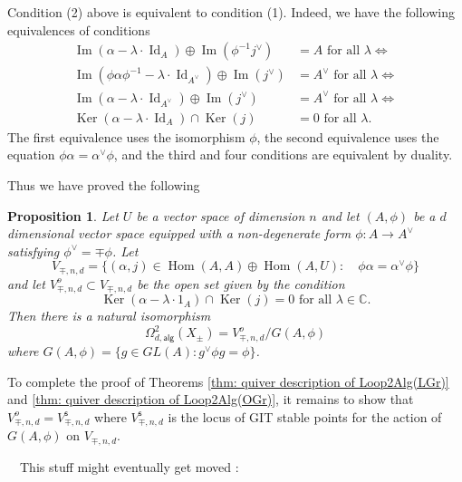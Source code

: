 \documentclass{amsart}
\newtheorem{proposition}[theorem]{Proposition}
\theoremstyle{definition}
\newcommand{\CC} {{\mathbb C}}          %
\newcommand{\Hom}{\operatorname{Hom}}
\newcommand{\Ker}{\operatorname{Ker}}
\newcommand{\im}{\operatorname{Im}}
\newcommand{\alg}{\mathsf{alg}}
\newcommand{\stable}{\mathsf{s}}
\newcommand{\LoopTwo}{\Omega^{2}_{d,\alg}}
\newcommand{\Id}{\operatorname{Id}}
\newcommand{\Xpm}{X_{\pm}}
\begin{document}
\bigskip

Condition (2) above is equivalent to condition (1). Indeed, we have
the following equivalences of conditions
\begin{align*}
\im (\alpha -\lambda \cdot \Id_{A})\oplus  \im (\phi^{-1}j^{\vee} )&=A
\text{ for all } \lambda \iff \\
\im (\phi \alpha\phi^{-1} -\lambda \cdot \Id_{A^{\vee }})\oplus  \im
(j^{\vee} )&=A^{\vee }
\text{ for all } \lambda \iff \\
\im (\alpha -\lambda \cdot \Id_{A^{\vee }})\oplus  \im
(j^{\vee} )&=A^{\vee }
\text{ for all } \lambda \iff \\
\Ker (\alpha -\lambda \cdot \Id_{A})\cap \Ker (j) &= 0 \text{ for all } \lambda .
\end{align*}
The first equivalence uses the isomorphism $\phi$, the second
equivalence uses the equation $\phi \alpha  = \alpha^{\vee}\phi$, and
the third and four conditions are equivalent by duality.

Thus we have proved the following
\begin{proposition}\label{prop: quiver description of Loop2Alg(Xpm)
with explicit open condition}
Let $U$ be a vector space of dimension $n$ and let $(A,\phi )$ be a
$d$ dimensional vector space equipped with a non-degenerate form $\phi
:A\to A^{\vee}$ satisfying $\phi^{\vee}=\mp \phi$. Let
\[
V_{\mp ,n,d} = \{(\alpha ,j)\in \Hom (A,A)\oplus \Hom (A,U):\quad \phi
\alpha =\alpha^{\vee}\phi \}
\]
and let $V^{o}_{\mp ,n,d}\subset V_{\mp ,n,d}$ be the open set given
by the condition
\[
\Ker (\alpha -\lambda \cdot 1_{A})\cap \Ker (j) = 0\text{ for all } \lambda \in \CC .
\]
Then there is a natural isomorphism
\[
\LoopTwo (\Xpm ) = V^{o}_{\mp ,n,d}/G(A,\phi )
\]
where $G(A,\phi ) = \{g\in GL(A): g^{\vee}\phi g = \phi \}$. 
\end{proposition}

To complete the proof of Theorems \ref{thm: quiver description of
Loop2Alg(LGr)} and \ref{thm: quiver description of Loop2Alg(OGr)}, it
remains to show that $V^{o}_{\mp ,n,d} = V^{\stable }_{\mp ,n,d}$
where $V^{\stable }_{\mp ,n,d}$ is the locus of GIT stable points for
the action of $G(A,\phi )$ on $V_{\mp ,n,d}$.







\vfill




\pagebreak

~~This stuff might eventually get moved :
\end{document}
